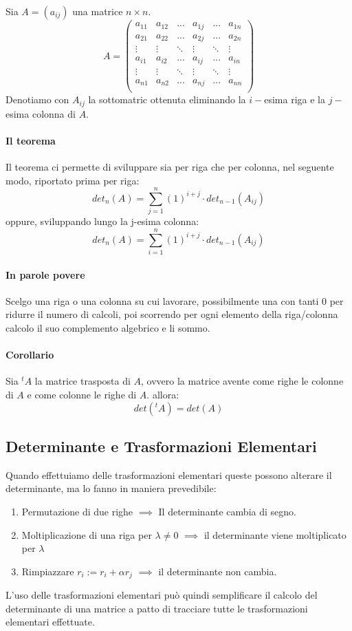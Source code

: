 Sia $A = (a_{ij})$ una matrice $n\times n$.
\[
	A = \begin{pmatrix}
		a_{11} & a_{12} & ...    & a_{1j} & ...    & a_{1n} \\
		a_{21} & a_{22} & ...    & a_{2j} & ...    & a_{2n} \\
		\vdots & \vdots & \ddots & \vdots & \ddots & \vdots \\
		a_{i1} & a_{i2} & ...    & a_{ij} & ...    & a_{in} \\
		\vdots & \vdots & \ddots & \vdots & \ddots & \vdots \\
		a_{n1} & a_{n2} & ...    & a_{nj} & ...    & a_{nn} \\
	\end{pmatrix}
\]
Denotiamo con $A_{ij}$ la sottomatric ottenuta eliminando la $i-$esima riga e la $j-$esima colonna di $A$.

\paragraph{Il teorema}
Il teorema ci permette di sviluppare sia per riga che per colonna, nel seguente modo, riportato prima per riga:
\[det_n(A) = \sum_{j=1}^{n} (1)^{i+j} \cdot det_{n-1}(A_{ij})\]
oppure, sviluppando lungo la j-esima colonna:
\[det_n(A) = \sum_{i=1}^{n} (1)^{i+j} \cdot det_{n-1}(A_{ij})\]

\paragraph{In parole povere}
Scelgo una riga o una colonna su cui lavorare, possibilmente una con tanti 0 per ridurre il numero di calcoli,
poi scorrendo per ogni elemento della riga/colonna calcolo il suo complemento algebrico e li sommo.

\paragraph{Corollario}
Sia $^tA$ la matrice trasposta di $A$, ovvero la matrice avente come righe le colonne di $A$ e come colonne le righe di $A$. allora:
\[ det(^tA) = det(A)\]

\subsection{Determinante e Trasformazioni Elementari}
Quando effettuiamo delle trasformazioni elementari queste possono alterare il determinante, ma lo fanno in maniera prevedibile:
\begin{enumerate}
	\item Permutazione di due righe $\implies$ Il determinante cambia di segno.
	\item Moltiplicazione di una riga per $\lambda \neq 0$  $\implies$ il determinante viene moltiplicato per $\lambda$
	\item Rimpiazzare $r_i := r_i + \alpha r_j$ $\implies$ il determinante non cambia.
\end{enumerate}
L'uso delle trasformazioni elementari può quindi semplificare il calcolo del determinante di una matrice a patto di tracciare tutte le trasformazioni elementari effettuate.

